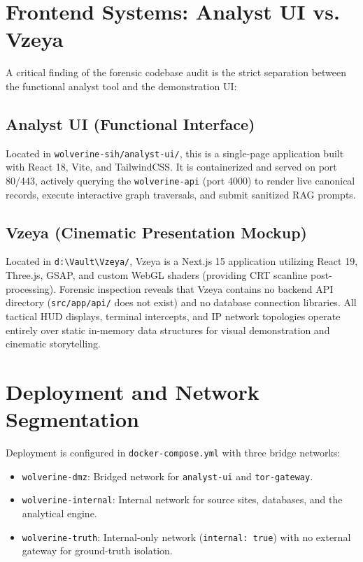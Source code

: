\section{Frontend Systems: Analyst UI vs. Vzeya}
\label{sec:impl-frontend}
A critical finding of the forensic codebase audit is the strict separation between the functional analyst tool and the demonstration UI:

\subsection{Analyst UI (Functional Interface)}
Located in \texttt{wolverine-sih/analyst-ui/}, this is a single-page application built with React 18, Vite, and TailwindCSS. It is containerized and served on port 80/443, actively querying the \texttt{wolverine-api} (port 4000) to render live canonical records, execute interactive graph traversals, and submit sanitized RAG prompts.

\subsection{Vzeya (Cinematic Presentation Mockup)}
Located in \texttt{d:\textbackslash Vault\textbackslash Vzeya/}, Vzeya is a Next.js 15 application utilizing React 19, Three.js, GSAP, and custom WebGL shaders (providing CRT scanline post-processing). Forensic inspection reveals that Vzeya contains no backend API directory (\texttt{src/app/api/} does not exist) and no database connection libraries. All tactical HUD displays, terminal intercepts, and IP network topologies operate entirely over static in-memory data structures for visual demonstration and cinematic storytelling.

\section{Deployment and Network Segmentation}
\label{sec:impl-deployment}
Deployment is configured in \texttt{docker-compose.yml} with three bridge networks:
\begin{itemize}
    \item \texttt{wolverine-dmz}: Bridged network for \texttt{analyst-ui} and \texttt{tor-gateway}.
    \item \texttt{wolverine-internal}: Internal network for source sites, databases, and the analytical engine.
    \item \texttt{wolverine-truth}: Internal-only network (\texttt{internal: true}) with no external gateway for ground-truth isolation.
\end{itemize}

